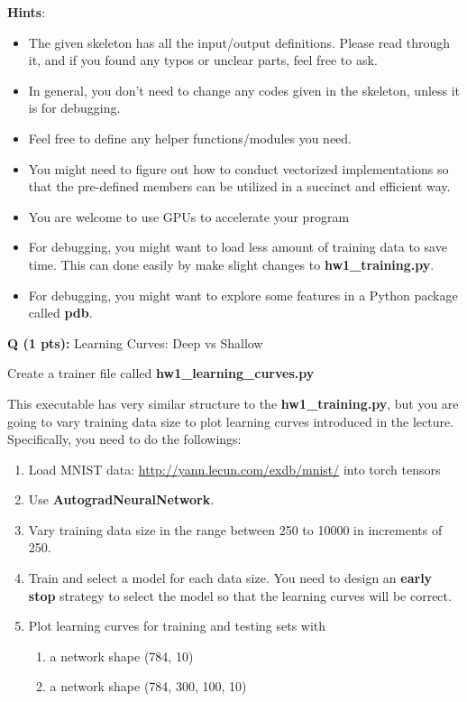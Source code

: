 \documentclass{article}
\newcommand{\homeworknumber}{1}
\newcounter{questionno}
\newcounter{partno}
\newcommand{\question}[1]{
\noindent
\newline
\stepcounter{questionno}
\setcounter{partno}{0}
{\bf Q\arabic{questionno} (#1 pts): }
}
\begin{document}
\noindent \textbf{Hints}:
\begin{itemize}
    \item The given skeleton has all the input/output definitions. Please read through it, and if you found any typos or unclear parts, feel free to ask.
    \item In general, you don't need to change any codes given in the skeleton, unless it is for debugging.
    \item Feel free to define any helper functions/modules you need.
    \item You might need to figure out how to conduct vectorized implementations so that the pre-defined members can be utilized in a succinct and efficient way.
    \item You are welcome to use GPUs to accelerate your program
    \item For debugging, you might want to load less amount of training data to save time. This can done easily by make slight changes to \textbf{hw\homeworknumber\_training.py}.
    \item For debugging, you might want to explore some features in a Python package called \textbf{pdb}.
\end{itemize}

\newpage
\question{1}{Learning Curves: Deep vs Shallow}

\noindent Create a trainer file called \textbf{hw\homeworknumber\_learning\_curves.py}

\hfill

\noindent This executable has very similar structure to the \textbf{hw\homeworknumber\_training.py}, but you are
going to vary training data size to plot learning curves introduced in the
lecture. Specifically, you need to do the followings:
\begin{enumerate}
  \item Load MNIST data: \url{http://yann.lecun.com/exdb/mnist/} into torch
        tensors
  \item Use \textbf{AutogradNeuralNetwork}.
  \item Vary training data size in the range between 250 to 10000 in increments of 250.
  \item Train and select a model for each data size. You need to design an \textbf{early
        stop} strategy to select the model so that the learning curves will be correct.
  \item Plot learning curves for training and testing sets with
    \begin{enumerate}
      \item a network shape (784, 10)
      \item a network shape (784, 300, 100, 10)
    \end{enumerate}
\end{enumerate}
\end{document}
